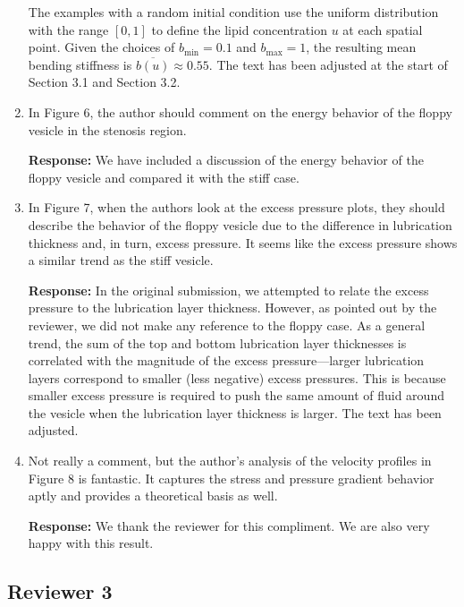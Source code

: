 \documentclass[11pt]{article}
\begin{document}
\begin{enumerate}
 The examples with a random initial condition
use the uniform distribution with the range $[0,1]$ to define the lipid
concentration $u$ at each spatial point. Given the choices of
$b_{\min}=0.1$ and $b_{\max}=1$, the resulting mean bending stiffness is
$\overline{b(u)} \approx 0.55$. The text has been adjusted at the start
of Section 3.1 and Section 3.2.

\item In Figure 6, the author should comment on the energy behavior of
  the floppy vesicle in the stenosis region.

\noindent
{\bf Response:} We have included a discussion of the energy behavior of
the floppy vesicle and compared it with the stiff case.

\item In Figure 7, when the authors look at the excess pressure plots,
  they should describe the behavior of the floppy vesicle due to the
  difference in lubrication thickness and, in turn, excess pressure. It
  seems like the excess pressure shows a similar trend as the stiff
  vesicle.

\noindent
{\bf Response:} In the original submission, we attempted to relate the
excess pressure to the lubrication layer thickness. However, as pointed
out by the reviewer, we did not make any reference to the floppy case.
As a general trend, the sum of the top and bottom lubrication layer
thicknesses is correlated with the magnitude of the excess
pressure---larger lubrication layers correspond to smaller (less
negative) excess pressures. This is because smaller excess pressure is
required to push the same amount of fluid around the vesicle when the
lubrication layer thickness is larger. The text has been adjusted.


\item Not really a comment, but the author's analysis of the velocity
  profiles in Figure 8 is fantastic. It captures the stress and pressure
  gradient behavior aptly and provides a theoretical basis as well.

\noindent
{\bf Response:} We thank the reviewer for this compliment. We are also
very happy with this result. 


\end{enumerate}

\newpage

\subsection*{Reviewer 3}
\end{document}
